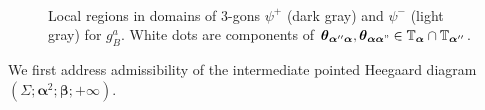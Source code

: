\documentclass[11pt]{article}
\theoremstyle{plain} \newtheorem{thm}{Theorem}[subsection]
\theoremstyle{plain} \newtheorem{cor}[thm]{Corollary}
\theoremstyle{plain} \newtheorem{prop}[thm]{Proposition}
\theoremstyle{plain} \newtheorem{conj}[thm]{Conjecture}
\theoremstyle{plain} \newtheorem{lem}[thm]{Lemma}
\theoremstyle{definition} \newtheorem{df}[thm]{Definition}
\theoremstyle{remark} \newtheorem{rmk}[thm]{Remark}
\theoremstyle{remark} \newtheorem{obs}[thm]{Observation}
\newcommand{\ba}{\boldsymbol{\alpha}}
\newcommand{\bb}{\boldsymbol{\beta}}
\newcommand{\thet}[1]{\boldsymbol{\theta}_{#1}}
\newcommand{\tor}[1]{\mathbb{T}_{#1}}
\begin{document}
\begin{figure}[h!]
\centering
{}
\\
\caption[Local components of 3-gon domains associated to the first handleslide for  $b \mapsto b B$]{Local regions in domains of 3-gons $\psi^{+}$ (dark gray) and $\psi^{-}$ (light gray) for $g_{B}^{a}$.  White dots are components of $\thet{\ba''\ba},\thet{\ba\ba"} \in \tor{\ba} \cap \tor{\ba''}$. \label{fig:move3hs1}}
\end{figure}

We first address admissibility of the intermediate pointed Heegaard diagram $\left( \Sigma; \ba^2; \bb; +\infty \right)$.
\end{document}
